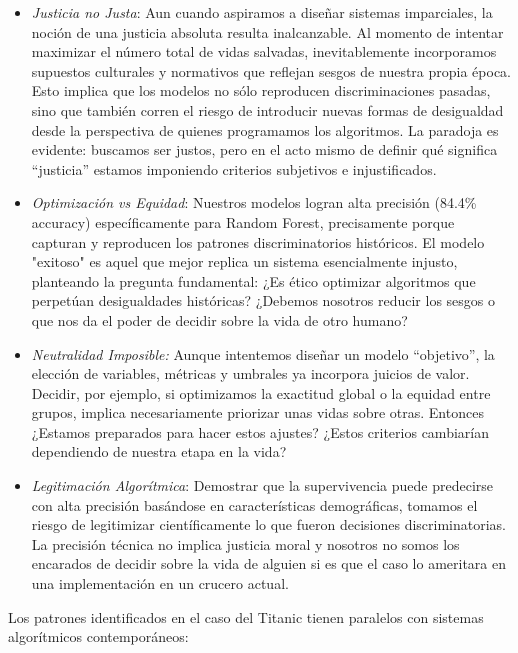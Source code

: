 \documentclass[conference]{IEEEtran}
\begin{document}
\begin{itemize}
    \item \emph{Justicia no Justa}: Aun cuando aspiramos a diseñar sistemas imparciales, la noción de una justicia absoluta resulta inalcanzable. Al momento de intentar maximizar el número total de vidas salvadas, inevitablemente incorporamos supuestos culturales y normativos que reflejan sesgos de nuestra propia época. Esto implica que los modelos no sólo reproducen discriminaciones pasadas, sino que también corren el riesgo de introducir nuevas formas de desigualdad desde la perspectiva de quienes programamos los algoritmos. La paradoja es evidente: buscamos ser justos, pero en el acto mismo de definir qué significa “justicia” estamos imponiendo criterios subjetivos e injustificados.
    \cite{oneill2016weapons}
    \item \emph{Optimización vs Equidad}: Nuestros modelos logran alta precisión (84.4\% accuracy) específicamente para Random Forest, precisamente porque capturan y reproducen los patrones discriminatorios históricos. El modelo "exitoso" es aquel que mejor replica un sistema esencialmente injusto, planteando la pregunta fundamental: ¿Es ético optimizar algoritmos que perpetúan desigualdades históricas? ¿Debemos nosotros reducir los sesgos o que nos da el poder de decidir sobre la vida de otro humano? \cite{barocas2016big}
    \item \emph{Neutralidad Imposible:} 
    Aunque intentemos diseñar un modelo ``objetivo'', la elección de variables, métricas y umbrales ya incorpora juicios de valor. Decidir, por ejemplo, si optimizamos la exactitud global o la equidad entre grupos, implica necesariamente priorizar unas vidas sobre otras. Entonces ¿Estamos preparados para hacer estos ajustes? ¿Estos criterios cambiarían dependiendo de nuestra etapa en la vida? \cite{floridi2018ai4people}
    \item  \emph{Legitimación Algorítmica}: Demostrar que la supervivencia puede predecirse con alta precisión basándose en características demográficas, tomamos el riesgo de legitimizar científicamente lo que fueron decisiones discriminatorias. La precisión técnica no implica justicia moral y nosotros no somos los encarados de decidir sobre la vida de alguien si es que el caso lo ameritara en una implementación en un crucero actual.
\end{itemize}

Los patrones identificados en el caso del Titanic tienen paralelos con sistemas algorítmicos contemporáneos:
\end{document}
